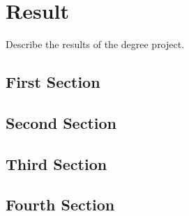 \chapter{Result}
Describe the results of the degree project.
\section{First Section}

\section{Second Section}

\section{Third Section}

\section{Fourth Section}
